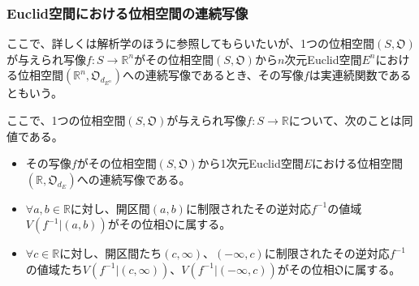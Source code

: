 \documentclass[dvipdfmx]{jsarticle}
\begin{document}
\subsubsection{Euclid空間における位相空間の連続写像}%
\begin{dfn}
ここで、詳しくは解析学のほうに参照してもらいたいが、1つの位相空間$\left( S,\mathfrak{O} \right)$が与えられ写像$f:S \rightarrow \mathbb{R}^{n}$がその位相空間$\left( S,\mathfrak{O} \right)$から$n$次元Euclid空間$E^{n}$における位相空間$\left( \mathbb{R}^{n},\mathfrak{O}_{d_{E^{n}}} \right)$への連続写像であるとき、その写像$f$は実連続関数であるともいう。
\end{dfn}
\begin{thm}\label{8.2.2.6}
ここで、1つの位相空間$\left( S,\mathfrak{O} \right)$が与えられ写像$f:S \rightarrow \mathbb{R}$について、次のことは同値である。
\begin{itemize}
\item
  その写像$f$がその位相空間$\left( S,\mathfrak{O} \right)$から1次元Euclid空間$E$における位相空間$\left( \mathbb{R},\mathfrak{O}_{d_{E}} \right)$への連続写像である。
\item
  $\forall a,b \in \mathbb{R}$に対し、開区間$(a,b)$に制限されたその逆対応$f^{- 1}$の値域$V\left( f^{- 1}|(a,b) \right)$がその位相$\mathfrak{O}$に属する。
\item
  $\forall c \in \mathbb{R}$に対し、開区間たち$(c,\infty)、( - \infty,c)$に制限されたその逆対応$f^{- 1}$の値域たち$V\left( f^{- 1}|(c,\infty) \right)$、$V\left( f^{- 1}|( - \infty,c) \right)$がその位相$\mathfrak{O}$に属する。
\end{itemize}
\end{thm}
\end{document}
